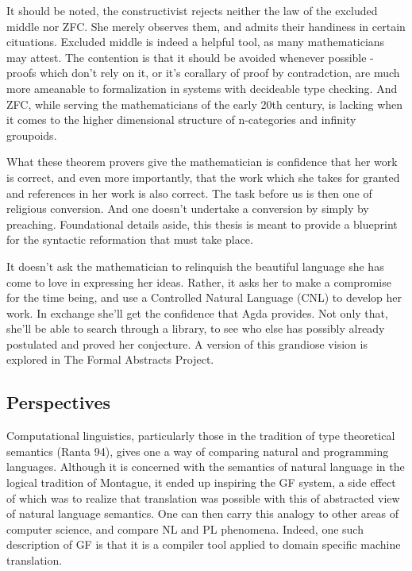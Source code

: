 \documentclass[11pt, a4paper]{article}
\begin{document}
It should be noted, the constructivist rejects neither the law of the excluded
middle nor ZFC. She merely observes them, and admits their handiness in certain
cituations. Excluded middle is indeed a helpful tool, as many mathematicians
may attest. The contention is that it should be avoided whenever possible -
proofs which don't rely on it, or it's corallary of proof by contradction, are
much more ameanable to formalization in systems with decideable type checking.
And ZFC, while serving the mathematicians of the early 20th century, is 
lacking when it comes to the higher dimensional structure of n-categories and
infinity groupoids.

What these theorem provers give the mathematician is confidence that her work
is correct, and even more importantly, that the work which she takes for
granted and references in her work is also correct. The task before us is then
one of religious conversion. And one doesn't undertake a conversion by simply
by preaching. Foundational details aside, this thesis is meant to provide a
blueprint for the syntactic reformation that must take place.  

It doesn't ask the mathematician to relinquish the beautiful language she has
come to love in expressing her ideas.  Rather, it asks her to make a compromise
for the time being, and use a Controlled Natural Language (CNL) to develop her
work. In exchange she'll get the confidence that Agda provides. Not only that,
she'll be able to search through a library, to see who else has possibly
already postulated and proved her conjecture. A version of this grandiose vision is 
explored in The Formal Abstracts Project.

\subsection{Perspectives}


Computational linguistics, particularly those in the tradition of type
theoretical semantics (Ranta 94), gives one a way of comparing natural and
programming languages. Although it is concerned with the semantics of natural
language in the logical tradition of Montague, it ended up inspiring the GF
system, a side effect of which was to realize that translation was possible with
this of abstracted view of natural language semantics. One can then carry this
analogy to other areas of computer science, and compare NL and PL phenomena.
Indeed, one such description of GF is that it is a compiler tool applied to
domain specific machine translation.
\end{document}
